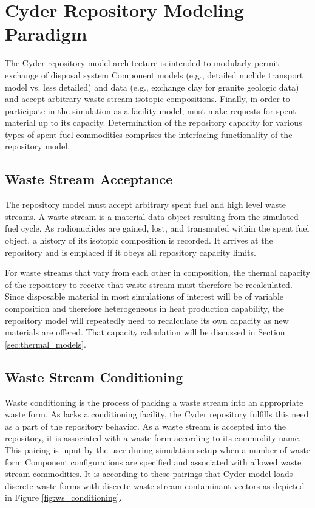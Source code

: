 \section{Cyder Repository Modeling Paradigm}

The Cyder repository model architecture is intended to modularly permit 
exchange of disposal system Component models (e.g., detailed nuclide transport 
model vs. less detailed) and data (e.g., exchange clay for granite geologic 
data) and accept arbitrary waste stream isotopic compositions.  
Finally, in order to participate in the simulation as a facility model, must 
make requests for spent material up to its capacity. Determination of the 
repository capacity for various types of spent fuel commodities comprises the 
interfacing functionality of the repository model.

\subsection{Waste Stream Acceptance}

The repository model must accept arbitrary spent fuel and high level waste 
streams. A waste stream is a material data object resulting from the \Cyclus 
simulated fuel cycle.  As radionuclides are gained, lost, and transmuted within 
the spent fuel object, a history of its isotopic composition is recorded.  It 
arrives at the repository and is emplaced if it obeys all repository capacity 
limits. 

For waste streams that vary from each other in composition, the thermal 
capacity of the repository to receive that waste stream must therefore be 
recalculated.  Since disposable material in most simulations of interest will 
be of variable composition and therefore heterogeneous in heat production 
capability, the repository model will repeatedly need to recalculate its own 
capacity as new materials are offered.  That capacity calculation will be 
discussed in Section \ref{sec:thermal_models}. 

\subsection{Waste Stream Conditioning}

Waste conditioning is the process of packing a waste stream into an appropriate 
waste form. As \Cyclus lacks a conditioning facility, the Cyder repository 
fulfills this need as a part of the repository behavior. As a waste stream is 
accepted into the repository, it is associated with a waste form according 
to its commodity name. This pairing is input by the user during simulation 
setup when a number of waste form Component configurations are specified and 
associated with allowed waste stream commodities. It is according to these 
pairings that Cyder model loads discrete waste forms with discrete waste 
stream contaminant vectors as depicted in Figure \ref{fig:ws_conditioning}.

